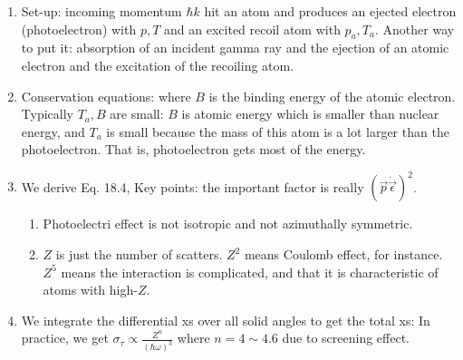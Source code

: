 \documentclass{school-22.101-notes}
\begin{document}
\begin{enumerate}
\item Set-up: incoming momentum $\hbar k$ hit an atom and produces an ejected electron (photoelectron) with $p, T$ and an excited recoil atom with $p_a, T_a$. Another way to put it: absorption of an incident gamma ray and the ejection of an atomic electron and the excitation of the recoiling atom. 

\item Conservation equations:
  where $B$ is the binding energy of the atomic electron. Typically $T_a, B$ are small: $B$ is atomic energy which is smaller than nuclear energy, and $T_a$ is small because the mass of this atom is a lot larger than the photoelectron. That is, photoelectron gets most of the energy. 

\item We derive Eq. 18.4, 
Key points: the important factor is really $(\vec{p} \dot \vec{\epsilon})^2$. 
\begin{enumerate}
\item Photoelectri effect is not isotropic and not azimuthally symmetric. 
\item $Z$ is just the number of scatters. $Z^2$ means Coulomb effect, for instance. $Z^5$ means the interaction is complicated, and that it is characteristic of atoms with high-$Z$. 
\end{enumerate}

\item We integrate the differential xs over all solid angles to get the total xs: 
  In practice, we get $\sigma_{\tau} \propto \frac{Z^n}{(\hbar \omega)^3}$ where $n = 4 \sim 4.6$ due to screening effect. 


\end{enumerate}
\end{document}
